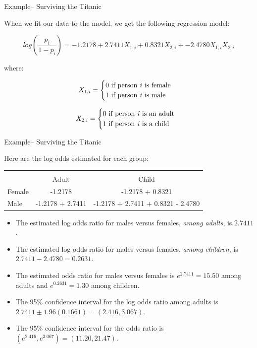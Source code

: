 \documentclass[ignorenonframetext,]{beamer}
\providecommand{\tightlist}{%
  \setlength{\itemsep}{0pt}\setlength{\parskip}{0pt}}
\begin{document}
\begin{frame}{Example-- Surviving the Titanic}

When we fit our data to the model, we get the following regression
model:

\[
log(\frac{p_i}{1 - p_i}) = -1.2178 + 2.7411X_{1,i} + 0.8321X_{2,i} + -2.4780X_{1,i}X_{2,i}
\]

where:

\begin{equation*}
    X_{1,i}=
    \begin{cases}
      0 \text{ if person \textit{i} is female} \\
      1 \text{ if person \textit{i} is male}
    \end{cases}
\end{equation*}

\begin{equation*}
    X_{2,i}=
    \begin{cases}
      0 \text{ if person \textit{i} is an adult} \\
      1 \text{ if person \textit{i} is a child}
    \end{cases}
\end{equation*}

\end{frame}

\begin{frame}{Example-- Surviving the Titanic}

Here are the log odds estimated for each group:

\centering

\begin{tabular}{lcc}
\toprule \\
 & Adult & Child \\
\midrule
Female & -1.2178 & -1.2178 + 0.8321 \\
Male   & -1.2178 + 2.7411 & -1.2178 + 2.7411 + 0.8321 - 2.4780 \\
\bottomrule
\end{tabular}

\small

\begin{itemize}
\tightlist
\item
  The estimated log odds ratio for males versus females, \emph{among
  adults}, is \(2.7411\).
\item
  The estimated log odds ratio for males versus females, \emph{among
  children}, is \(2.7411 - 2.4780 = 0.2631\).
\item
  The estimated odds ratio for males versus females is
  \(e^{2.7411} = 15.50\) among adults and \(e^{0.2631} = 1.30\) among
  children.
\item
  The 95\% confidence interval for the log odds ratio among adults is
  \(2.7411 \pm 1.96(0.1661) = (2.416, 3.067)\).
\item
  The 95\% confidence interval for the odds ratio is
  \((e^{2.416}, e^{3.067}) = (11.20, 21.47)\).
\end{itemize}

\end{frame}
\end{document}
